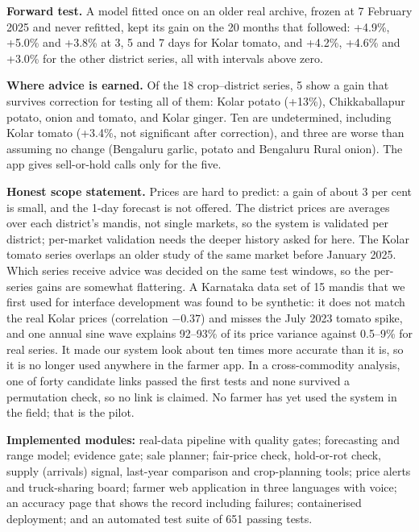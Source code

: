 \documentclass[11pt,a4paper]{article}
\begin{document}
\textbf{Forward test.} A model fitted once on an older real archive, frozen at 7 February 2025 and never refitted, kept its gain on the 20 months that followed: +4.9\%, +5.0\% and +3.8\% at 3, 5 and 7 days for Kolar tomato, and +4.2\%, +4.6\% and +3.0\% for the other district series, all with intervals above zero.

\textbf{Where advice is earned.} Of the 18 crop--district series, 5 show a gain that survives correction for testing all of them: Kolar potato (+13\%), Chikkaballapur potato, onion and tomato, and Kolar ginger. Ten are undetermined, including Kolar tomato (+3.4\%, not significant after correction), and three are worse than assuming no change (Bengaluru garlic, potato and Bengaluru Rural onion). The app gives sell-or-hold calls only for the five.

\textbf{Honest scope statement.} Prices are hard to predict: a gain of about 3 per cent is small, and the 1-day forecast is not offered. The district prices are averages over each district's mandis, not single markets, so the system is validated per district; per-market validation needs the deeper history asked for here. The Kolar tomato series overlaps an older study of the same market before January 2025. Which series receive advice was decided on the same test windows, so the per-series gains are somewhat flattering. A Karnataka data set of 15 mandis that we first used for interface development was found to be synthetic: it does not match the real Kolar prices (correlation $-0.37$) and misses the July 2023 tomato spike, and one annual sine wave explains 92--93\% of its price variance against 0.5--9\% for real series. It made our system look about ten times more accurate than it is, so it is no longer used anywhere in the farmer app. In a cross-commodity analysis, one of forty candidate links passed the first tests and none survived a permutation check, so no link is claimed. No farmer has yet used the system in the field; that is the pilot.

\textbf{Implemented modules:} real-data pipeline with quality gates; forecasting and range model; evidence gate; sale planner; fair-price check, hold-or-rot check, supply (arrivals) signal, last-year comparison and crop-planning tools; price alerts and truck-sharing board; farmer web application in three languages with voice; an accuracy page that shows the record including failures; containerised deployment; and an automated test suite of 651 passing tests.
\end{document}
